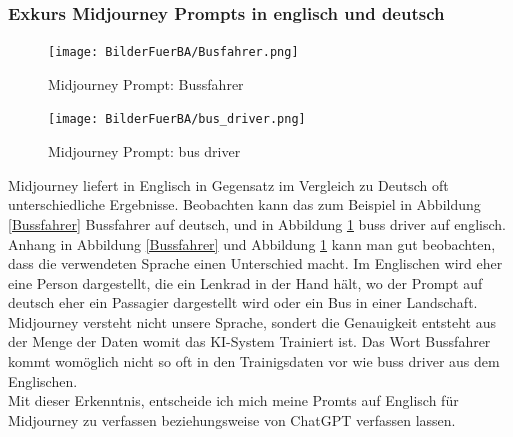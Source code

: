 \subsubsection{Exkurs Midjourney Prompts in englisch und deutsch}
\begin{figure}
	\centering
	\begin{minipage}[t]{0.45\linewidth}
		\centering
		\texttt{[image: BilderFuerBA/Busfahrer.png]}
		\caption{Midjourney Prompt: Bussfahrer}
		\label{Bussfahrer}
	\end{minipage}
	\hfill
	\begin{minipage}[t]{0.45\linewidth}
		\centering
		\texttt{[image: BilderFuerBA/bus\_driver.png]}
		\caption{Midjourney Prompt: bus driver}
		\label{bus_driver}
	\end{minipage}
\end{figure}
Midjourney liefert in Englisch in Gegensatz im Vergleich zu Deutsch oft unterschiedliche Ergebnisse. Beobachten kann das zum Beispiel in Abbildung \ref{Bussfahrer} Bussfahrer auf deutsch, und in Abbildung \ref{bus_driver} buss driver auf englisch.
\\
Anhang in Abbildung \ref{Bussfahrer} und Abbildung \ref{bus_driver} kann man gut beobachten, dass die verwendeten Sprache einen Unterschied macht. Im Englischen wird eher eine Person dargestellt, die ein Lenkrad in der Hand hält, wo der Prompt auf deutsch eher ein Passagier dargestellt wird oder ein Bus in einer Landschaft.
\\
Midjourney versteht nicht unsere Sprache, sondert die Genauigkeit entsteht aus der Menge der Daten womit das KI-System Trainiert ist. Das Wort Bussfahrer kommt womöglich nicht so oft in den Trainigsdaten vor wie buss driver aus dem Englischen.
\\
Mit dieser Erkenntnis, entscheide ich mich meine Promts auf Englisch für Midjourney zu verfassen beziehungsweise von ChatGPT verfassen lassen.
\newpage
